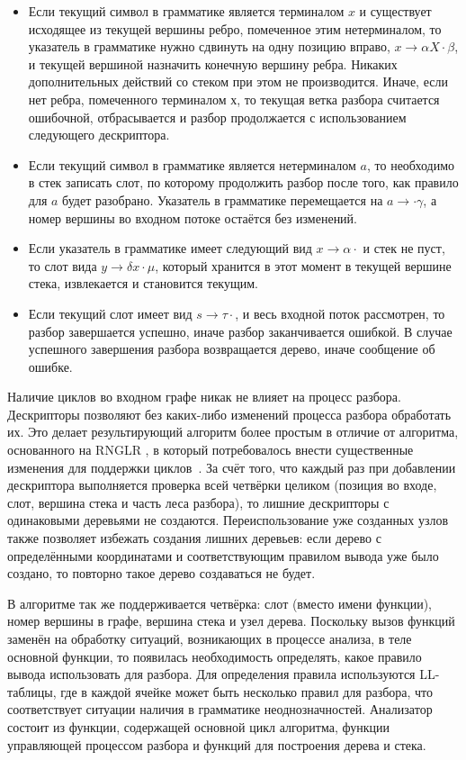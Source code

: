 \begin{itemize}
\item Если текущий символ в грамматике является терминалом $x$ и существует исходящее из текущей вершины ребро, помеченное этим нетерминалом, то указатель в грамматике нужно сдвинуть на одну позицию вправо, $x \rightarrow \alpha X \cdot \beta$, и текущей вершиной назначить конечную вершину ребра. Никаких дополнительных действий со стеком при этом не производится. Иначе, если нет ребра, помеченного терминалом $х$, то текущая ветка разбора считается ошибочной, отбрасывается и  разбор продолжается с использованием следующего дескриптора.
\item Если текущий символ в грамматике является нетерминалом $a$, то необходимо в стек записать слот, по которому продолжить разбор после того, как правило для $a$ будет разобрано. Указатель в грамматике перемещается на $a \rightarrow \cdot \gamma $, а номер вершины во входном потоке остаётся без изменений.
\item Если указатель в грамматике имеет следующий вид $x \rightarrow \alpha\cdot$ и стек не пуст, то слот вида $y \rightarrow \delta x \cdot \mu$, который хранится в этот момент в текущей вершине стека, извлекается и становится текущим.
\item Если текущий слот имеет вид $s \rightarrow \tau\cdot$, и весь входной поток рассмотрен, то разбор завершается успешно, иначе разбор заканчивается ошибкой. В случае успешного завершения разбора возвращается дерево, иначе сообщение об ошибке.
\end{itemize}

Наличие циклов во входном графе никак не влияет на процесс разбора. Дескрипторы позволяют без каких-либо изменений процесса разбора обработать их. Это делает результирующий алгоритм более простым в отличие от алгоритма, основанного на RNGLR , в который потребовалось внести существенные изменения для поддержки циклов~\cite{RelaxedARNGLR}. За счёт того, что каждый раз при добавлении дескриптора выполняется проверка всей четвёрки целиком (позиция во входе, слот, вершина стека и часть леса разбора), то лишние дескрипторы с одинаковыми деревьями не создаются. Переиспользование уже созданных узлов также позволяет избежать создания лишних деревьев: если дерево с определёнными координатами и соответствующим правилом вывода уже было создано, то повторно такое дерево создаваться не будет.

В алгоритме так же поддерживается четвёрка: слот (вместо имени функции), номер вершины в графе, вершина стека и узел дерева. Поскольку вызов функций заменён на обработку ситуаций, возникающих в процессе анализа, в теле основной функции, то появилась необходимость определять, какое правило вывода использовать для разбора. Для определения правила используются LL-таблицы, где в каждой ячейке может быть несколько правил для разбора, что соответствует ситуации наличия в грамматике неоднозначностей. Анализатор состоит из функции, содержащей основной цикл алгоритма, функции управляющей процессом разбора и функций для построения дерева и стека.

